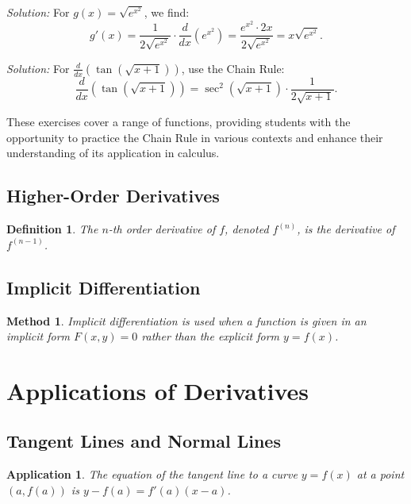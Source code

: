 \documentclass[a4paper,12pt]{book}
\newenvironment{solution}[1][]
{\par\noindent\textit{Solution:} \rmfamily}{\medskip}
\newtheorem{application}{Application}
\newtheorem{definition}{Definition}
\newtheorem{method}{Method}
\begin{document}
\begin{solution}[to Exercise 3]
For \( g(x) = \sqrt{e^{x^2}} \), we find:
\[ g'(x) = \frac{1}{2\sqrt{e^{x^2}}} \cdot \frac{d}{dx}(e^{x^2}) = \frac{e^{x^2} \cdot 2x}{2\sqrt{e^{x^2}}} = x \sqrt{e^{x^2}}. \]
\end{solution}

\begin{solution}[to Exercise 4]
For \( \frac{d}{dx} \left( \tan(\sqrt{x + 1}) \right) \), use the Chain Rule:
\[ \frac{d}{dx} \left( \tan(\sqrt{x + 1}) \right) = \sec^2(\sqrt{x + 1}) \cdot \frac{1}{2\sqrt{x + 1}}. \]
\end{solution}

These exercises cover a range of functions, providing students with the opportunity to practice the Chain Rule in various contexts and enhance their understanding of its application in calculus.


\subsection{Higher-Order Derivatives}
\begin{definition}
The \( n \)-th order derivative of \( f \), denoted \( f^{(n)} \), is the derivative of \( f^{(n-1)} \).
\end{definition}

\subsection{Implicit Differentiation}
\begin{method}
Implicit differentiation is used when a function is given in an implicit form \( F(x, y) = 0 \) rather than the explicit form \( y = f(x) \).
\end{method}

\section{Applications of Derivatives}
\subsection{Tangent Lines and Normal Lines}
\begin{application}
The equation of the tangent line to a curve \( y = f(x) \) at a point \( (a, f(a)) \) is \( y - f(a) = f'(a)(x - a) \).
\end{application}
\end{document}
